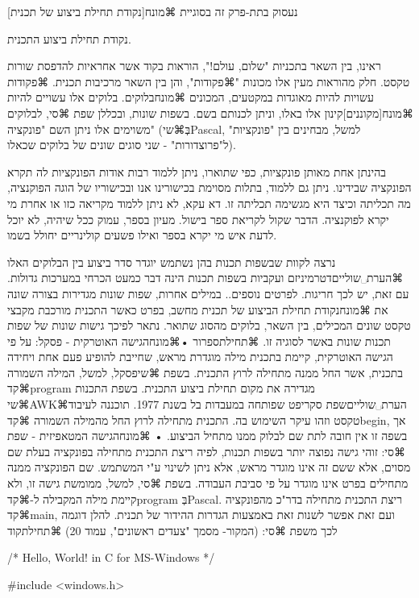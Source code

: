 נעסוק בתת-פרק זה בסוגיית ⌘מונח[נקודת תחילת ביצוע של תכנית]{נקודת תחילת ביצוע התכנית.

ראינו, בין השאר בתכניות "שלום, עולם!", הוראות בקוד אשר אחראיות להדפסת שורות טקסט. חלק מהוראות מעין אלו מכונות "⌘פקודות", והן בין השאר מרכיבות תכנית. ⌘פקודות עשויות להיות מאוגדות במקטעים, המכונים ⌘מונח{בלוקים}. בלוקים אלו עשויים להיות ⌘מונח[מקוננים]{קינון} אלו באלו, וניתן לכנותם בשם. בשפות שונות, ובכללן שפת ⌘סי, לבלוקים משוימים אלו ניתן השם "פונקציה" (בְּ⌘שי{Pascal}, למשל, מבחינים בין "פונקציות" ל"פרוצדורות" - שני סוגים שונים של בלוקים שכאלו). 

בהינתן אחת מאותן פונקציות, כפי שתוארו, ניתן ללמוד רבות אודות הפונקציות לה תקרא הפונקציה שבידינו. ניתן גם ללמוד, בתלות מסוימת בכישורינו אנו ובכישוריו של הוגה הפוקנציה, מה תכליתה וכיצד היא מגשימה תכליתה זו. דא עקא, לא ניתן ללמוד מקריאה כזו או אחרת מי יקרא לפוקנציה. הדבר שקול לקריאת ספר בישול. מעיון בספר, עמוק ככל שיהיה, לא יוכל לדעת איש מי יקרא בספר ואילו פשעים קולינריים יחולל בשמו. 

נרצה לקוות שבשפות תכנות בהן נשתמש יוגדר סדר ביצוע בין הבלוקים האלו ⌘הערת␣שוליים{דטרמיניזם ועקביות בשפות תכנות הינה דבר כמעט הכרחי במערכות גדולות. עם זאת, יש לכך חריגות. לפרטים נוספים.}. במילים אחרות, שפות שונות מגדירות בצורה שונה את ⌘מונח{נקודת תחילת הביצוע} של תכנית מחשב, בפרט כאשר התכנית מורכבת מקבצי טקסט שונים המכילים, בין השאר, בלוקים מהסוג שתואר. נתאר לפיכך גישות שונות של שפות תכנות שונות באשר לסוגיה זו.
⌘תחילת{ספרור}
•⌘מונח{הגישה האוטרקית} - פסקל: על פי הגישה האוטרקית, קיימת בתכנית מילה מוגדרת מראש, שחייבת להופיע פעם אחת ויחידה בתכנית, אשר החל ממנה מתחילה לרוץ התכנית. בשפת ⌘שי{פסקל}, למשל, המילה השמורה ⌘קד{program} מגדירה את מקום תחילת ביצוע התכנית. בשפת התכנות ⌘שי{AWK}⌘הערת␣שוליים{שפת סקריפט שפותחה במעבדות בל בשנת 1977. תוכננה לעיבוד טקסט וזהו עיקר השימוש בה.} התכנית מתחילה לרוץ החל מהמילה השמורה ⌘קד{begin}, אך בשפה זו אין חובה לתת שם לבלוק ממנו מתחיל הביצוע.
• ⌘מונח{הגישה המטאפיזית} - שפת ⌘סי: זוהי גישה נפוצה יותר בשפות תכנות, לפיה ריצת התכנית מתחילה בפונקציה בעלת שם מסוים, אלא ששם זה אינו מוגדר מראש, אלא ניתן לשינוי ע"י המשתמש. שם הפונקציה ממנה מתחילים 
בפרט אינו מוגדר על פי סביבת העבודה. בשפת ⌘סי, למשל, ממומשת גישה זו, ולא קיימת מילה המקבילה
ל-⌘קד{program} בְּPascal. ריצת התכנית מתחילה בדר"כ מהפונקציה ⌘קד{main}, ועם זאת אפשר לשנות זאת באמצעות
הגדרות ההידור של תכנית. להלן דוגמה לכך משפת ⌘סי: (המקור- מסמך "צעדים ראשונים", עמוד 20)
⌘תחילת{קוד}

/* Hello, World! in C for MS-Windows */

#include <windows.h>

}
